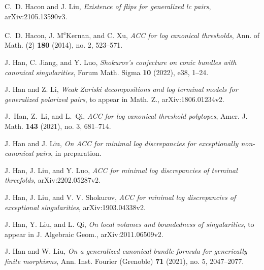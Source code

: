\documentclass[11pt]{amsart}
\numberwithin{equation}{section}
\theoremstyle{definition}
\theoremstyle{definition}
\begin{document}
\begin{thebibliography}{99}




C.~D. Hacon and J. Liu, \emph{Existence of flips for generalized lc pairs}, arXiv:2105.13590v3.

 C.~D. Hacon, J. M\textsuperscript{c}Kernan, and C. Xu, \textit{ACC for log canonical thresholds}, Ann. of Math. (2) \textbf{180} (2014), no. 2, 523--571.


 J. Han, C. Jiang, and Y. Luo, \textit{Shokurov's conjecture on conic bundles with canonical singularities}, Forum Math. Sigma \textbf{10} (2022), e38, 1--24.

J. Han and Z. Li, \emph{Weak {Z}ariski decompositions and log terminal models for generalized polarized pairs}, to appear in Math. Z., arXiv:1806.01234v2.


 J.~Han, Z.~Li, and L.~Qi, \textit{ACC for log canonical threshold polytopes}, Amer. J. Math. \textbf{143} (2021), no. 3, 681--714.

 J. Han and J. Liu, \textit{On ACC for minimal log discrepancies for exceptionally non-canonical pairs}, in preparation.

 J. Han, J. Liu, and Y. Luo, \textit{ACC for minimal log discrepancies of terminal threefolds}, arXiv:2202.05287v2.

	
 J. Han, J. Liu, and V. V. Shokurov, \textit{ACC for minimal log discrepancies of exceptional singularities}, arXiv:1903.04338v2.

 J. Han, Y. Liu, and L. Qi, \textit{On local volumes and boundedness of singularities}, to appear in J. Algebraic Geom., arXiv:2011.06509v2.


 J. Han and W. Liu, \emph{On a generalized canonical bundle formula for generically finite morphisms}, Ann. Inst. Fourier (Grenoble) \textbf{71} (2021), no. 5, 2047--2077. 


\end{thebibliography}
\end{document}

